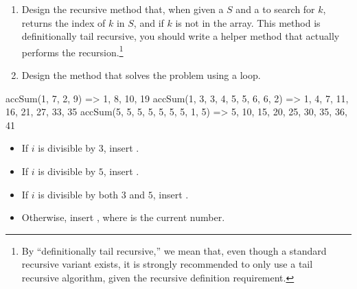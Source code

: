

\begin{enumerate}[label=(\alph*)]
    \item Design the recursive  method that, when given a  $S$ and a  to search for $k$, returns the index of $k$ in $S$, and  if $k$ is not in the array. This method is definitionally tail recursive, you should write a  helper method that actually performs the recursion.\footnote{By ``definitionally tail recursive,'' we mean that, even though a standard recursive variant exists, it is strongly recommended to only use a tail recursive algorithm, given the recursive definition requirement.}
    \item Design the  method that solves the problem using a loop. 
\end{enumerate}

\begin{verbnobox}[\small]
accSum({1, 7, 2, 9})                => {1, 8, 10, 19}
accSum({1, 3, 3, 4, 5, 5, 6, 6, 2}) => {1, 4, 7, 11, 16, 21, 27, 33, 35}
accSum({5, 5, 5, 5, 5, 5, 5, 1, 5}) => {5, 10, 15, 20, 25, 30, 35, 36, 41}
\end{verbnobox}


    \begin{itemize}
        \item If $i$ is divisible by $3$, insert .
        \item If $i$ is divisible by $5$, insert .
        \item If $i$ is divisible by both $3$ and $5$, insert .
        \item Otherwise, insert , where  is the current number.
    \end{itemize}


